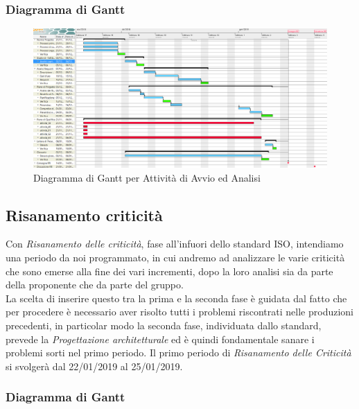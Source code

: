 \begin{landscape}
\subsubsection{Diagramma di Gantt}
\begin{figure}[H]
	\centering
  		\includegraphics[width=1.0\linewidth]{./images/AvvioAnalisi.png}
  		\caption{Diagramma di Gantt per Attività di Avvio ed Analisi}
  		\label{fig:Gantt Avvio ed Analisi}
\end{figure}
\end{landscape}

\subsection{Risanamento criticità}

Con \textit{Risanamento delle criticità}, fase all'infuori dello standard ISO, intendiamo una periodo da noi programmato, in cui andremo ad analizzare le varie criticità che sono emerse alla fine dei vari incrementi, dopo la loro analisi sia da parte della proponente che da parte del gruppo. \\
La scelta di inserire questo tra la prima e la seconda fase è guidata dal fatto che per procedere è necessario aver risolto tutti i problemi riscontrati nelle produzioni precedenti, in particolar modo la seconda fase, individuata dallo standard, prevede la \textit{Progettazione architetturale} ed è quindi fondamentale sanare i problemi sorti nel primo periodo. 
Il primo periodo di \textit{Risanamento delle Criticità} si svolgerà dal 22/01/2019 al 25/01/2019.

\subsubsection{Diagramma di Gantt}

